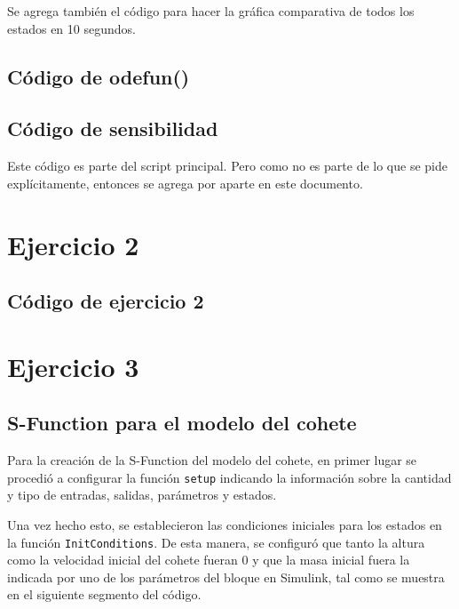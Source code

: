\documentclass[12pt,letterpaper]{article}
\begin{document}
Se agrega también el código para hacer la gráfica comparativa de todos los estados en 10 segundos.


\subsection{Código de odefun()}

\subsection{Código de sensibilidad}
Este código es parte del script principal. Pero como no es parte de lo que se pide explícitamente, entonces se agrega por aparte en este documento.
 





\section{Ejercicio 2}


\subsection{Código de ejercicio 2}

\section{Ejercicio 3}

\subsection{S-Function para el modelo del cohete}
Para la creación de la S-Function del modelo del cohete, en primer lugar se procedió a configurar la
función \texttt{setup} indicando la información sobre la cantidad y tipo de entradas, salidas,
parámetros y estados.

Una vez hecho esto, se establecieron las condiciones iniciales para los estados en la función
\texttt{InitConditions}. De esta manera, se configuró que tanto la altura como la velocidad inicial
del cohete fueran 0 y que la masa inicial fuera la indicada por uno de los parámetros del bloque en
Simulink, tal como se muestra en el siguiente segmento del código.
\end{document}

